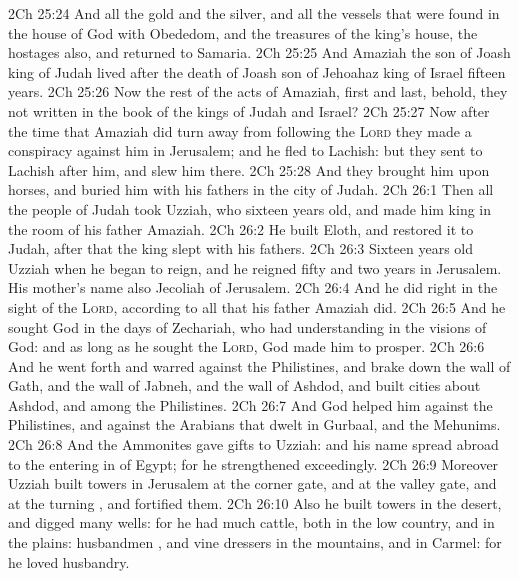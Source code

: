 \vs 2Ch 25:24 And  all the gold and the silver, and all the vessels that were found in the house of God with Obededom, and the treasures of the king's house, the hostages also, and returned to Samaria.
\vs 2Ch 25:25 And Amaziah the son of Joash king of Judah lived after the death of Joash son of Jehoahaz king of Israel fifteen years.
\vs 2Ch 25:26 Now the rest of the acts of Amaziah, first and last, behold,  they not written in the book of the kings of Judah and Israel?
\vs 2Ch 25:27 Now after the time that Amaziah did turn away from following the \textsc{Lord} they made a conspiracy against him in Jerusalem; and he fled to Lachish: but they sent to Lachish after him, and slew him there.
\vs 2Ch 25:28 And they brought him upon horses, and buried him with his fathers in the city of Judah.
\vs 2Ch 26:1 Then all the people of Judah took Uzziah, who  sixteen years old, and made him king in the room of his father Amaziah.
\vs 2Ch 26:2 He built Eloth, and restored it to Judah, after that the king slept with his fathers.
\vs 2Ch 26:3 Sixteen years old  Uzziah when he began to reign, and he reigned fifty and two years in Jerusalem. His mother's name also  Jecoliah of Jerusalem.
\vs 2Ch 26:4 And he did  right in the sight of the \textsc{Lord}, according to all that his father Amaziah did.
\vs 2Ch 26:5 And he sought God in the days of Zechariah, who had understanding in the visions of God: and as long as he sought the \textsc{Lord}, God made him to prosper.
\vs 2Ch 26:6 And he went forth and warred against the Philistines, and brake down the wall of Gath, and the wall of Jabneh, and the wall of Ashdod, and built cities about Ashdod, and among the Philistines.
\vs 2Ch 26:7 And God helped him against the Philistines, and against the Arabians that dwelt in Gurbaal, and the Mehunims.
\vs 2Ch 26:8 And the Ammonites gave gifts to Uzziah: and his name spread abroad  to the entering in of Egypt; for he strengthened  exceedingly.
\vs 2Ch 26:9 Moreover Uzziah built towers in Jerusalem at the corner gate, and at the valley gate, and at the turning , and fortified them.
\vs 2Ch 26:10 Also he built towers in the desert, and digged many wells: for he had much cattle, both in the low country, and in the plains: husbandmen , and vine dressers in the mountains, and in Carmel: for he loved husbandry.
